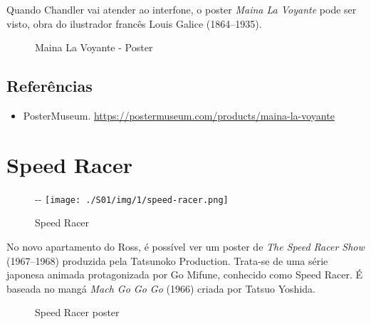 Quando Chandler vai atender ao interfone, o poster \emph{Maina La
Voyante} pode ser visto, obra do ilustrador francês Louis Galice
(1864--1935).

\begin{figure}
  \centering
    \caption{Maina La Voyante - Poster\label{fig:maina-la-voyante-poster}}
\end{figure}

\hypertarget{referuxeancias-3}{%
\subsection{Referências}\label{referuxeancias-3}}

\begin{itemize}
\tightlist
\item
  \sloppy PosterMuseum. \url{https://postermuseum.com/products/maina-la-voyante}
\end{itemize}

\hypertarget{speed-racer}{%
\section{Speed Racer}\label{speed-racer}}

\begin{figure}[!ht]
  \begin{adjustwidth}{-\oddsidemargin-1in}{-\rightmargin}
    \centering
    \texttt{[image: ./S01/img/1/speed-racer.png]}
    \caption{Speed Racer\label{fig:speed-racer}}
  \end{adjustwidth}
\end{figure}

No novo apartamento do Ross, é possível ver um poster de \emph{The Speed
Racer Show} (1967--1968) produzida pela Tatsunoko Production. Trata-se
de uma série japonesa animada protagonizada por Go Mifune, conhecido
como Speed Racer. É baseada no mangá \emph{Mach Go Go Go} (1966) criada
por Tatsuo Yoshida.

\begin{figure}
  \centering
    \caption{Speed Racer poster\label{fig:speed-racer-poster}}
\end{figure}

